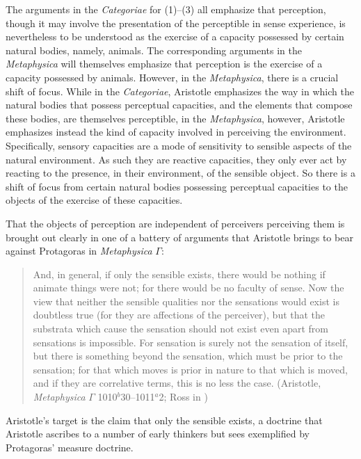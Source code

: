 The arguments in the \emph{Categoriae} for (1)--(3) all emphasize that perception, though it may involve the presentation of the perceptible in sense experience, is nevertheless to be understood as the exercise of a capacity possessed by certain natural bodies, namely, animals. The corresponding arguments in the \emph{Metaphysica} will themselves emphasize that perception is the exercise of a capacity possessed by animals. However, in the \emph{Metaphysica}, there is a crucial shift of focus. While in the \emph{Categoriae}, Aristotle emphasizes the way in which the natural bodies that possess perceptual capacities, and the elements that compose these bodies, are themselves perceptible, in the \emph{Metaphysica}, however, Aristotle emphasizes instead the kind of capacity involved in perceiving the environment. 
Specifically, sensory capacities are a mode of sensitivity to sensible aspects of the natural environment. As such they are reactive capacities, they only ever act by reacting to the presence, in their environment, of the sensible object. So there is a shift of focus from certain natural bodies possessing perceptual capacities to the objects of the exercise of these capacities.


That the objects of perception are independent of perceivers perceiving them is brought out clearly in one of a battery of arguments that Aristotle brings to bear against Protagoras in \emph{Metaphysica} \( \Gamma \):
\begin{quote}
	And, in general, if only the sensible exists, there would be nothing if animate things were not; for there would be no faculty of sense. Now the view that neither the sensible qualities nor the sensations would exist is doubtless true (for they are affections of the perceiver), but that the substrata which cause the sensation should not exist even apart from sensations is impossible. For sensation is surely not the sensation of itself, but there is something beyond the sensation, which must be prior to the sensation; for that which moves is prior in nature to that which is moved, and if they are correlative terms, this is no less the case. (Aristotle, \emph{Metaphysica} \( \Gamma \) 1010\( ^{b} \)30--1011\( ^{a} \)2; Ross in \citealt[55--56]{Barnes:1984kx})
\end{quote}
Aristotle's target is the claim that only the sensible exists, a doctrine that Aristotle ascribes to a number of early thinkers but sees exemplified by Protagoras' measure doctrine. 

